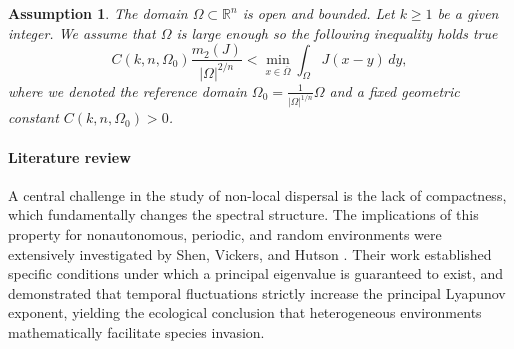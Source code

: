 \documentclass[12pt, a4paper]{article}
\theoremstyle{break}
\theoremstyle{break}
\theoremstyle{break}
\newtheorem{asm}{Assumption}[section]
\theoremstyle{break}
\theoremstyle{break}
\theoremstyle{break}
\theoremstyle{break}
\theoremstyle{break}
\theoremstyle{break}
\begin{document}
\begin{asm}
    \label{asm:DomainProperties_3}
    The domain $\Omega \subset \mathbb{R}^n$ is open and bounded. Let $k \geq 1$ be a given integer. We assume that $\Omega$ is large enough so the following inequality holds true
    \begin{equation} \label{eq:variance_condition}
        C(k,n,\Omega_0)\frac{m_2(J)}{|\Omega|^{2/n}} < \min_{x \in \overline{\Omega}} \int_\Omega J(x-y) \, dy,
    \end{equation}
    where we denoted the reference domain $\Omega_0 = \frac{1}{|\Omega|^{1/n}}\Omega$ and a fixed geometric constant $C(k, n, \Omega_0) > 0$.
\end{asm}

\paragraph{Literature review}

A central challenge in the study of non-local dispersal is the lack of compactness, which fundamentally changes the spectral structure. The implications of this property for nonautonomous, periodic, and random environments were extensively investigated by Shen, Vickers, and Hutson \cite{ShenVickers2007, HutsonShenVickers2008}. Their work established specific conditions under which a principal eigenvalue is guaranteed to exist, and demonstrated that temporal fluctuations strictly increase the principal Lyapunov exponent, yielding the ecological conclusion that heterogeneous environments mathematically facilitate species invasion.
\end{document}
